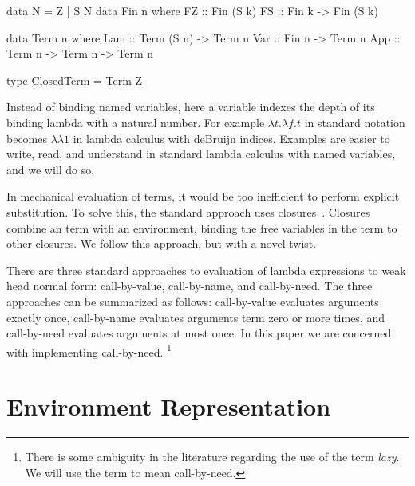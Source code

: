\documentclass[preprint]{sigplanconf}
\begin{document}
\begin{code}
data N = Z | S N
data Fin n where
  FZ :: Fin (S k)
  FS :: Fin k -> Fin (S k)

data Term n where
  Lam :: Term (S n) -> Term n
  Var :: Fin n -> Term n 
  App :: Term n -> Term n -> Term n

type ClosedTerm = Term Z
\end{code}

Instead of binding named variables, here a variable indexes the depth of its
binding lambda with a natural number. For example $\lambda t.\lambda f.t$ in
standard notation becomes $\lambda\lambda1$ in lambda calculus with deBruijn
indices.  Examples are easier to write, read, and understand in standard lambda
calculus with named variables, and we will do so.

In mechanical evaluation of terms, it would be too inefficient to perform
explicit substitution. To solve this, the standard approach uses
closures~\cite{landin1964mechanical, curien1991abstract, jonesstg,
biernacka2007concrete}. Closures combine an term with an environment, binding
the free variables in the term to other closures. We follow this
approach, but with a novel twist. 

There are three standard approaches to evaluation of lambda expressions to weak
head normal form: call-by-value, call-by-name, and call-by-need. The three
approaches can be summarized as follows: call-by-value evaluates arguments
exactly once, call-by-name evaluates arguments term zero or more times, and
call-by-need evaluates arguments at most once. In this paper we are concerned
with implementing call-by-need. \footnote{There is some ambiguity in the
literature regarding the use of the term \emph{lazy}. We will use the term to
mean call-by-need.}

\section{Environment Representation} \label{sec:env}
\end{document}
